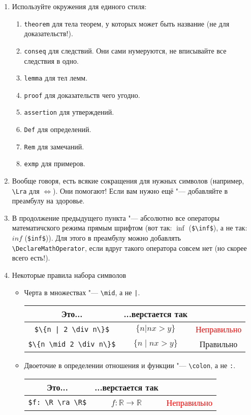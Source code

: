 \documentclass[12pt,a4paper]{book}
\def\ra{\rightarrow}
\def\Lra{\Leftrightarrow}
\def\R{\mathbb{R}}
\newcounter{theorem}[section]
\newcounter{conseq}[theorem]
\newcommand{\ok}{& \textcolor{green!60!black}{Правильно}}
\newcommand{\bad}{& \textcolor{red}{Неправильно}}
\begin{document}
\begin{enumerate}
\item Используйте окружения для единого стиля:
\begin{enumerate}
\item \verb'theorem' для тела теорем, у которых может быть название (не для доказательств!).
\item \verb'conseq' для следствий. Они сами нумеруются, не вписывайте все следствия в одно.
\item \verb'lemma' для тел лемм.
\item \verb'proof' для доказательств чего угодно.
\item \verb'assertion' для утверждений.
\item \verb'Def' для определений.
\item \verb'Rem' для замечаний.
\item \verb'exmp' для примеров.
\end{enumerate}
\item Вообще говоря, есть всякие сокращения для нужных символов (например, \verb'\Lra' для $\Lra$). Они помогают! Если вам нужно ещё "--- добавляйте в преамбулу на здоровье.
\item В продолжение предыдущего пункта "--- абсолютно все операторы математичского режима прямым шрифтом (вот так: $\inf$ (\verb'$\inf$'), а не так: $inf$ (\verb'$inf$')). Для этого в преамбулу можно добавлять \verb'\DeclareMathOperator', если вдруг такого оператора совсем нет (но скорее всего есть!).
\item Некоторые правила набора символов
\begin{itemize}
\item Черта в множествах "--- \verb'\mid', а не \verb'|'.
\begin{center}\begin{tabular}{|c|c|c|}
\hline Это... & ...верстается так & \\
\hline \verb'$\{n | 2 \div n\}$' & $\{n | nx > y\}$ \bad \\
\hline \verb'$\{n \mid 2 \div n\}$' & $\{n \mid nx > y\}$ \ok \\
\hline
\end{tabular}\end{center}
\item Двоеточие в определении отношения и функции "--- \verb'\colon', а не \verb':'.
\begin{center}\begin{tabular}{|c|c|c|}
\hline Это... & ...верстается так & \\
\hline \verb'$f: \R \ra \R$' & $f:\R\ra\R$ \bad \\

\end{tabular}
\end{center}
\end{itemize}
\end{enumerate}
\end{document}
